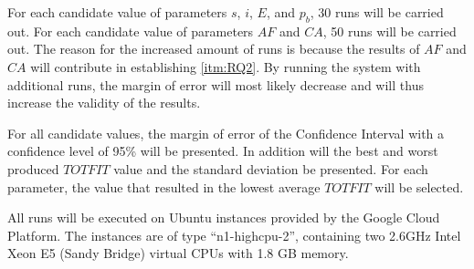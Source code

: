 For each candidate value of parameters $s$, $i$, $E$, and $p_b$, 30 runs will be carried out. For each candidate value of parameters $AF$ and $CA$, 50 runs will be carried out. The reason for the increased amount of runs is because the results of $AF$ and $CA$ will contribute in establishing \vref{itm:RQ2}. By running the system with additional runs, the margin of error will most likely decrease and will thus increase the validity of the results.

For all candidate values, the margin of error of the Confidence Interval with a confidence level of 95\% will be presented. In addition will the best and worst produced $TOTFIT$ value and the standard deviation be presented. For each parameter, the value that resulted in the lowest average $TOTFIT$ will be selected. 

All runs will be executed on Ubuntu instances provided by the Google Cloud Platform\citep{website:google}. The instances are of type ``n1-highcpu-2'', containing two 2.6GHz Intel Xeon E5 (Sandy Bridge) virtual CPUs with 1.8 GB memory. 

